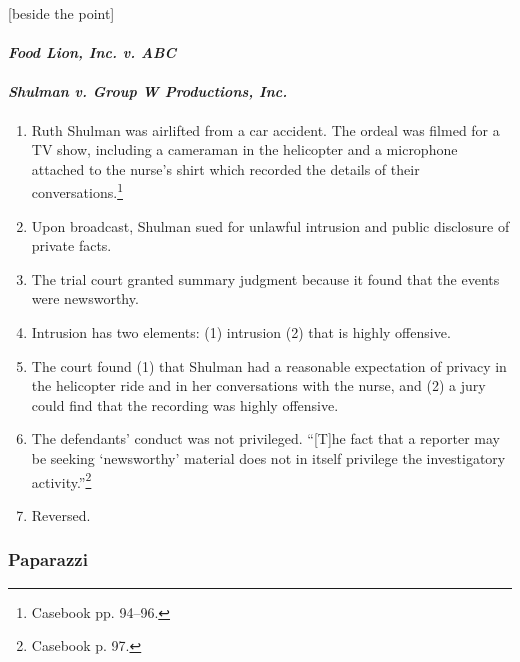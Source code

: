 [beside the point] %

\paragraph{\emph{Food Lion, Inc. v. ABC}}


\paragraph{\emph{Shulman v. Group W Productions, Inc.}}

\begin{enumerate}
    \item Ruth Shulman was airlifted from a car accident. The ordeal was filmed 
    for a TV show, including a cameraman in the helicopter and a microphone 
    attached to the nurse's shirt which recorded the details of their 
    conversations.\footnote{Casebook pp. 94--96.}
    \item Upon broadcast, Shulman sued for unlawful intrusion and public 
    disclosure of private facts.
    \item The trial court granted summary judgment because it found that the 
    events were newsworthy.
    \item Intrusion has two elements: (1) intrusion (2) that is highly 
    offensive.
    \item The court found (1) that Shulman had a reasonable expectation of 
    privacy in the helicopter ride and in her conversations with the nurse, and 
    (2) a jury could find that the recording was highly offensive.
    \item The defendants' conduct was not privileged. ``[T]he fact that a 
    reporter may be seeking `newsworthy' material does not in itself privilege 
    the investigatory activity.''\footnote{Casebook p. 97.}
    \item Reversed.
\end{enumerate}

\subsubsection{Paparazzi}

